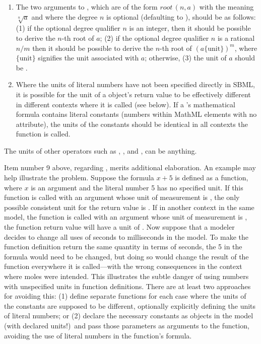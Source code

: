 \begin{enumerate}
\item The two arguments to , which are of the form
  $\textit{root}\,(n,a)$ with the meaning $\sqrt[n]{a}$ and where
  the degree $n$ is optional (defaulting to ), should be as
  follows: (1) if the optional degree qualifier $n$ is an integer,
  then it should be possible to derive the $n$-th root of $a$; (2)
  if the optional degree qualifier $n$ is a rational $n/m$ then it
  should be possible to derive the $n$-th root of $(a
  \{\text{unit}\})^m$, where $\{\text{unit}\}$ signifies the unit
  associated with $a$; otherwise, (3) the unit of $a$ should be
  .

\item Where the units of literal numbers have not been specified
  directly in SBML, it is possible for the unit of a
  \FunctionDefinition object's return value to be effectively
  different in different contexts where it is called (see below).
  If a \FunctionDefinition's mathematical formula contains literal
  constants (\ie numbers within MathML  elements with no
   attribute), the units of the constants should
  be identical in all contexts the function is called.

\end{enumerate}

The units of other operators such as , ,
and , can be anything.

Item number 9 above, regarding \FunctionDefinition, merits
additional elaboration.  An example may help illustrate the
problem.  Suppose the formula $x + 5$ is defined as a function,
where $x$ is an argument and the literal number 5 has no specified
unit.  If this function is called with an argument whose unit of
measurement is , the only possible consistent unit for
the return value is .  If in another context in the
same model, the function is called with an argument whose unit of
measurement is , the function return value will have
a unit of .  Now suppose that a modeler decides to
change all uses of seconds to milliseconds in the model.  To make
the function definition return the same quantity in terms of
seconds, the 5 in the formula would need to be changed, but doing
so would change the result of the function everywhere it is
called---with the wrong consequences in the context where moles
were intended.  This illustrates the subtle danger of using
numbers with unspecified units in function definitions.  There are
at least two approaches for avoiding this: (1) define separate
functions for each case where the units of the constants are
supposed to be different, optionally explicitly defining the units
of literal numbers; or (2) declare the necessary constants as
\Parameter objects in the model (with declared units!)\ and pass
those parameters as arguments to the function, avoiding the use of
literal numbers in the function's formula.


